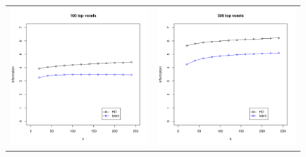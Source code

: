 \begin{figure}
\centering
\begin{tabular}{cc}
\includegraphics[scale = 0.4]{../../Yuval/ident_infer1.pdf} &
\includegraphics[scale = 0.4]{../../Yuval/ident_infer3.pdf} \\

\end{tabular}
\end{figure}
